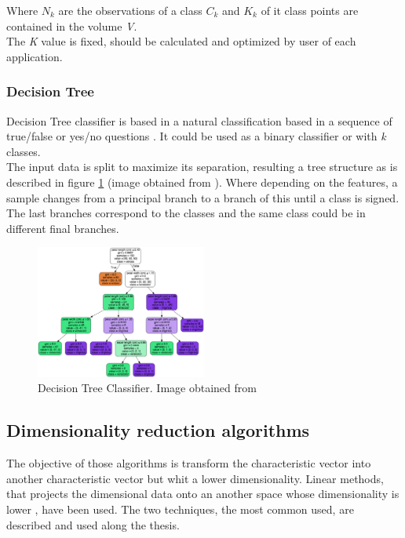 Where $N_k$ are the observations of a class $C_k$ and $K_k$ of it class points are contained in the volume \textit{V}.\\

The \textit{K} value is fixed, should be calculated and optimized by user of each application.\\

\subsubsection{Decision Tree}
Decision Tree classifier is based in a natural classification based in a sequence of true/false or yes/no questions \cite{Duda}. It could be used as a binary classifier or with \textit{k} classes. \\

The input data is split to maximize its separation, resulting a tree structure \cite{ClassifiersReview} as is described in figure \ref{fig:Tree} (image obtained from \cite{Treeimage}). Where depending on the features, a sample changes from a principal branch to a branch of this until a class is signed. The last branches correspond to the classes and the same class could be in different final branches. \\

\begin{figure}[htb]
\centering
\includegraphics[width=0.5\textwidth]{images_miscelaneus/tree.png}
\caption{Decision Tree Classifier. Image obtained from \cite{Treeimage}} \label{fig:Tree}
\end{figure}

\subsection{Dimensionality reduction algorithms}
The objective of those algorithms is transform the characteristic vector into another characteristic vector but whit a lower dimensionality. Linear methods, that projects the dimensional data onto an another space whose dimensionality is lower \cite{Duda}, have been used. The two techniques, the most common used, are described and used along the thesis.\\

